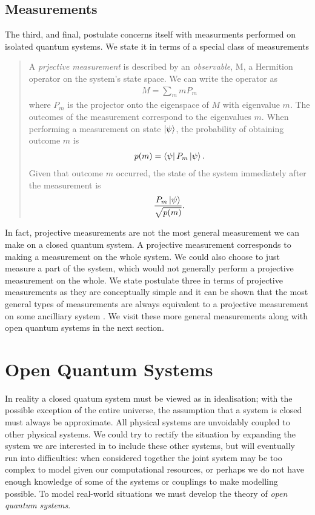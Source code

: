 \subsection{Measurements}

The third, and final, postulate concerns itself with measurments performed on isolated quantum systems. We state it in terms of a special class of measurements
\begin{quotation}
  A \textit{prjective measurement} is described by an \textit{observable}, M, a Hermition operator on the system's state space. We can write the operator as
  \begin{align}
    M = \sum_m mP_m
  \end{align}
  where $P_m$ is the projector onto the eigenspace of $M$ with eigenvalue $m$. The outcomes of the measurement correspond to the eigenvalues $m$. When performing a measurement on state $\left\vert\psi\right\rangle$, the probability of obtaining outcome $m$ is
  \begin{align}
    p(m) = \left\langle \psi\right\vert P_m\left\vert\psi\right\rangle.
  \end{align}
  Given that outcome $m$ occurred, the state of the system immediately after the measurement is
  \begin{align}
    \frac{P_m\left\vert\psi\right\rangle}{\sqrt{p(m)}}.
  \end{align}
\end{quotation}
In fact, projective measurements are not the most general measurement we can make on a closed quantum system. A projective measurement corresponds to making a measurement on the whole system. We could also choose to just measure a part of the system, which would not generally perform a projective measurement on the whole. We state postulate three in terms of projective measurements as they are conceptually simple and it can be shown that the most general types of measurements are always equivalent to a projective measurement on some ancilliary system \cite{neumark}. We visit these more general measurements along with open quantum systems in the next section.


\section{Open Quantum Systems}

In reality a closed quatum system must be viewed as in idealisation; with the possible exception of the entire universe, the assumption that a system is closed must always be approximate. All physical systems are unvoidably coupled to other physical systems. We could try to rectify the situation by expanding the system we are interested in to include these other systems, but will eventually run into difficulties: when considered together the joint system may be too complex to model given our computational resources, or perhaps we do not have enough knowledge of some of the systems or couplings to make modelling possible. To model real-world situations we must develop the theory of \textit{open quantum systems}. 

